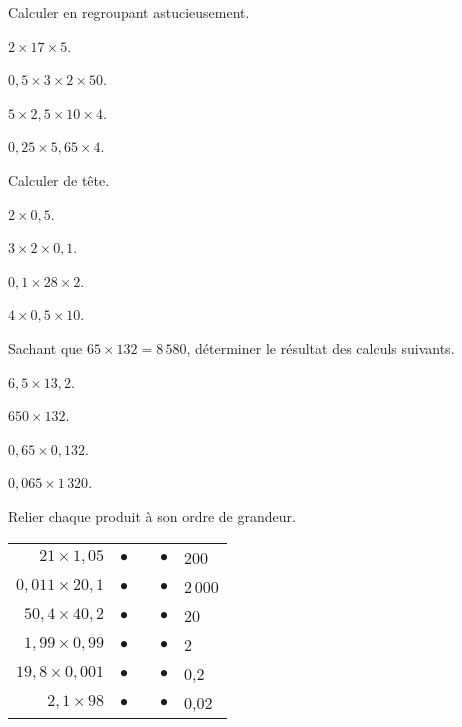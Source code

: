 \begin{colonne*exercice}


\begin{exercice}
   Calculer en regroupant astucieusement.
   \begin{colenumerate}{2}
      \item $2\times17\times5$.
      \item $0,5\times3\times2\times50$.
      \item $5\times2,5\times10\times 4$.
      \item $0,25\times5,65\times4$.
   \end{colenumerate}
\end{exercice}
 
\smallskip
 
\begin{exercice}
   Calculer de tête.
   \begin{colenumerate}{2}
      \item $2\times0,5$.
      \item $3\times2\times0,1$.
      \item $0,1\times28\times2$.
      \item $4\times0,5\times10$.
   \end{colenumerate}
\end{exercice}

\smallskip

\begin{exercice}
   Sachant que $65\times132 =8\,580$, déterminer le résultat des calculs suivants.
   \begin{colenumerate}{2}
      \item $6,5\times13,2$.
      \item $650\times132$.
      \item $0,65\times0,132$.
      \item $0,065\times1\,320$.
   \end{colenumerate}
\end{exercice}

\medskip


\begin{exercice}
   Relier chaque produit à son ordre de grandeur.
   \begin{tabular}{rcp{2cm}cp{2cm}}
      $21\times1,05$ & $\bullet$ & & $\bullet$ & 200 \\
      $0,011\times20,1$ & $\bullet$ & & $\bullet$ & 2\,000 \\
      $50,4\times40,2$ & $\bullet$ & & $\bullet$ & 20 \\
      $1,99\times0,99$ & $\bullet$ & & $\bullet$ & 2 \\
      $19,8\times0,001$ & $\bullet$ & & $\bullet$ & 0,2 \\
      $2,1\times98$ & $\bullet$ & & $\bullet$ & 0,02 \\
   \end{tabular}
\end{exercice} 


\end{colonne*exercice}

